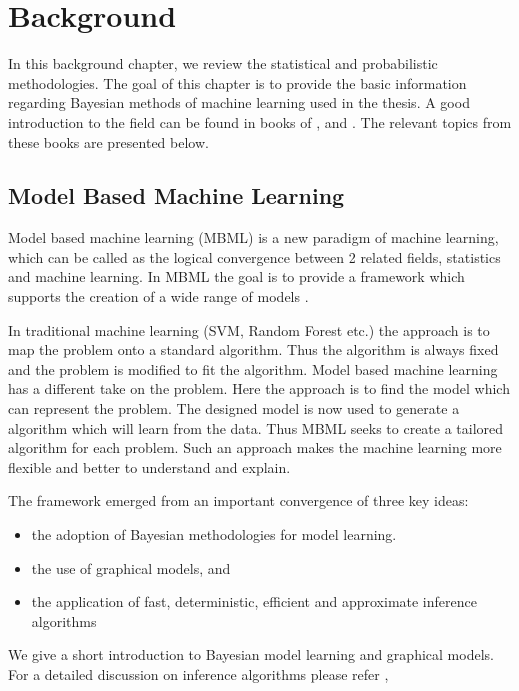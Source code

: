 

\chapter{Background}
\label{chapter:basics}
In this background chapter, we review the statistical and probabilistic methodologies.
The goal of this chapter is to provide the basic information regarding Bayesian methods of machine learning used in the thesis. A good introduction to the field can be found in books of \cite{bishop2007pattern}, \cite{kruschke2014doing} and \cite{lee2014bayesian}. The relevant topics from these books are presented below.

\section{Model Based Machine Learning}

Model based machine learning  (MBML) is a new paradigm of machine learning, which can be called as the logical convergence between 2 related fields, statistics and machine learning. In MBML the goal is to provide a framework which supports the creation of a wide range of models \citep{Bishop20120222}.

In traditional machine learning (SVM, Random Forest etc.) the approach is to map the problem onto a standard algorithm. Thus the algorithm is always fixed and the problem is modified to fit the algorithm. Model based machine learning has a different take on the problem. Here the approach is to find the model which can represent the problem. The designed model is now used to generate a algorithm which will learn from the data. Thus MBML seeks to create a tailored algorithm for each problem. Such an approach makes the machine learning more flexible and better to understand and explain.

The framework emerged from an important convergence of three key ideas:
   \begin{itemize}
	\item the adoption of Bayesian methodologies for model learning.
	\item the use of graphical models, and
	\item the application of fast, deterministic, efficient and approximate inference algorithms
\end{itemize}

We give a short introduction to Bayesian model learning and graphical models. For a detailed discussion on inference algorithms please refer \cite{beal2003variational}, \cite{minka2001family}

